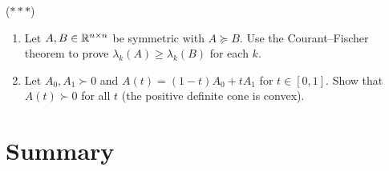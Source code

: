 \documentclass[11pt,a4paper]{article}
\begin{document}
\begin{exercise}
\label{exer:pd_proof}
\textnormal{(\(***\))} \\
\begin{enumerate}[nosep,label=(\alph*)]
  \item Let $A, B \in \mathbb{R}^{n \times n}$ be symmetric with $A \succeq B$.
        Use the Courant--Fischer theorem to prove $\lambda_k(A) \geq \lambda_k(B)$
        for each $k$.
  \item Let $A_0, A_1 \succ 0$ and $A(t) = (1-t)A_0 + tA_1$ for
        $t \in [0,1]$.  Show that $A(t) \succ 0$ for all $t$ (the positive
        definite cone is convex).
\end{enumerate}
\end{exercise}

\section{Summary}
\label{sec:summary}
\end{document}
